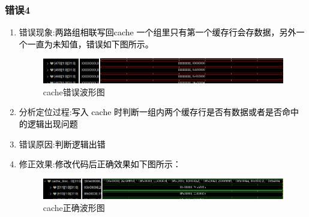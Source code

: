 \subsubsection{错误4}
\begin{enumerate}[(1)]
    \item 错误现象:\textcolor{black}{两路组相联写回cache 一个组里只有第一个缓存行会存数据，另外一个一直为未知值，错误如下图所示。}
    
    \begin{figure}[htbp]
        \centering
        \includegraphics[width=\textwidth]{image/errorcache.png}
        \caption{cache错误波形图}
    \end{figure}
    
    \item 分析定位过程:\textcolor{black}{写入 cache 时判断一组内两个缓存行是否有数据或者是否命中的逻辑出现问题}
    \item 错误原因:\textcolor{black}{判断逻辑出错}
    \item 修正效果:\textcolor{black}{修改代码后正确效果如下图所示：}
    \begin{figure}[htbp]
        \centering
        \includegraphics[width=\textwidth]{image/cachesuccess.png}
        \caption{cache正确波形图}
    \end{figure}
\end{enumerate}

